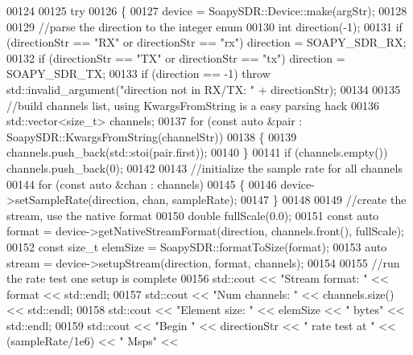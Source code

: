 \begin{DoxyCode}
{{{{00124 
00125     \textcolor{keywordflow}{try}
00126     \{
00127         device = SoapySDR::Device::make(argStr);
00128 
00129         \textcolor{comment}{//parse the direction to the integer enum}
00130         \textcolor{keywordtype}{int} direction(-1);
00131         \textcolor{keywordflow}{if} (directionStr == \textcolor{stringliteral}{"RX"} or directionStr == \textcolor{stringliteral}{"rx"}) direction = 
      SOAPY_SDR_RX;
00132         \textcolor{keywordflow}{if} (directionStr == \textcolor{stringliteral}{"TX"} or directionStr == \textcolor{stringliteral}{"tx"}) direction = 
      SOAPY_SDR_TX;
00133         \textcolor{keywordflow}{if} (direction == -1) \textcolor{keywordflow}{throw} std::invalid\_argument(\textcolor{stringliteral}{"direction not in RX/TX: "} + directionStr);
00134 
00135         \textcolor{comment}{//build channels list, using KwargsFromString is a easy parsing hack}
00136         std::vector<size\_t> channels;
00137         \textcolor{keywordflow}{for} (\textcolor{keyword}{const} \textcolor{keyword}{auto} &pair : SoapySDR::KwargsFromString(channelStr))
00138         \{
00139             channels.push\_back(std::stoi(pair.first));
00140         \}
00141         \textcolor{keywordflow}{if} (channels.empty()) channels.push\_back(0);
00142 
00143         \textcolor{comment}{//initialize the sample rate for all channels}
00144         \textcolor{keywordflow}{for} (\textcolor{keyword}{const} \textcolor{keyword}{auto} &chan : channels)
00145         \{
00146             device->setSampleRate(direction, chan, sampleRate);
00147         \}
00148 
00149         \textcolor{comment}{//create the stream, use the native format}
00150         \textcolor{keywordtype}{double} fullScale(0.0);
00151         \textcolor{keyword}{const} \textcolor{keyword}{auto} format = device->getNativeStreamFormat(direction, channels.front(), fullScale);
00152         \textcolor{keyword}{const} \textcolor{keywordtype}{size\_t} elemSize = SoapySDR::formatToSize(format);
00153         \textcolor{keyword}{auto} stream = device->setupStream(direction, format, channels);
00154 
00155         \textcolor{comment}{//run the rate test one setup is complete}
00156         std::cout << \textcolor{stringliteral}{"Stream format: "} << format << std::endl;
00157         std::cout << \textcolor{stringliteral}{"Num channels: "} << channels.size() << std::endl;
00158         std::cout << \textcolor{stringliteral}{"Element size: "} << elemSize << \textcolor{stringliteral}{" bytes"} << std::endl;
00159         std::cout << \textcolor{stringliteral}{"Begin "} << directionStr << \textcolor{stringliteral}{" rate test at "} << (sampleRate/1e6) << \textcolor{stringliteral}{" Msps"} << 
}}}}
\end{DoxyCode}
